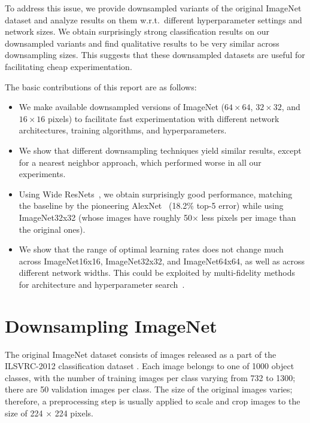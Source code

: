 \documentclass{article} \usepackage{iclr2017_conference,times}
\begin{document}
To address this issue, we provide downsampled variants of the original ImageNet dataset and analyze results on them w.r.t.\ different hyperparameter settings and network sizes. We obtain surprisingly strong classification results on our downsampled variants and find qualitative results to be very similar across downsampling sizes. This suggests that these downsampled datasets are useful for facilitating cheap experimentation.

The basic contributions of this report are as follows:
\begin{itemize}
\item We make available downsampled versions of ImageNet ($64\times 64$, $32\times 32$, and $16\times16$ pixels) to facilitate fast experimentation with different network architectures, training algorithms, and hyperparameters.
\item We show that different downsampling techniques yield similar results, except for a nearest neighbor approach, which performed worse in all our experiments.
\item Using Wide ResNets~\citep{zagoruyko2016wide}, we obtain surprisingly good performance, matching the baseline by the pioneering AlexNet~\citep{krizhevsky2012imagenet} (18.2\% top-5 error) while using ImageNet32x32 (whose images have roughly 50$\times$ less pixels per image than the original ones). 
\item We show that the range of optimal learning rates does not change much across ImageNet16x16, ImageNet32x32, and ImageNet64x64, as well as across different network widths. This could be exploited by multi-fidelity methods for architecture and hyperparameter search~\citep{li2016hyperband,klein2016fast}.
\end{itemize}

\section{Downsampling ImageNet}\label{sec:downsampling}

The original ImageNet dataset consists of images released as a part of the ILSVRC-2012 classification dataset \citep{krizhevsky2012imagenet,ILSVRC15}. Each image belongs to one of 1000 object classes, with the number of training images per class varying from 732 to 1300; there are 50 validation images per class. The size of the original images varies; therefore, a preprocessing step is usually applied to scale and crop images to the size of 224 $\times$ 224 pixels.
\end{document}
